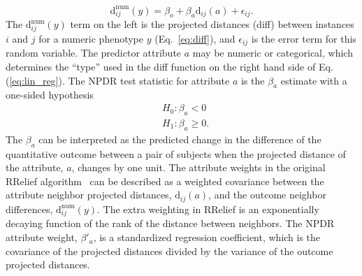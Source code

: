 \documentclass[10pt]{article}
\begin{document}

%
%
\begin{equation}\label{eq:lin_reg}
    \text{d}^{\text{num}}_{ij}(y) = \beta_{o} + \beta_{a} \text{d}_{ij}(a) + \epsilon_{ij}.
\end{equation}
The $\text{d}^{\text{num}}_{ij}(y)$ term on the left is the projected distances (diff) between instances $i$ and $j$ for a numeric phenotype $y$ (Eq.~\ref{eq:diff}), and $\epsilon_{ij}$ is the error term for this random variable.
The predictor attribute $a$ may be numeric or categorical, which determines the ``type'' used in the diff function on the right hand side of Eq.(\ref{eq:lin_reg}).
The NPDR test statistic for attribute $a$ is the $\beta_a$ estimate with a one-sided hypothesis
\begin{equation}\label{eq:linreg_null}
\begin{aligned}
    & H_0: \beta_a < 0 \\
    & H_1: \beta_a \ge 0.
\end{aligned}
\end{equation}
The $\beta_a$ can be interpreted as the predicted change in the difference of the quantitative outcome between a pair of subjects when the projected distance of the attribute, $a$, changes by one unit.
The attribute weights in the original RRelief algorithm~\cite{robnik2003theoretical} can be described as a weighted covariance between the attribute neighbor projected distances, $\text{d}_{ij}(a)$, and the outcome neighbor differences, $\text{d}^{\text{num}}_{ij}(y)$.
The extra weighting in RRelief is an exponentially decaying function of the rank of the distance between neighbors.
The NPDR attribute weight, $\beta'_a$, is a standardized regression coefficient, which is the covariance of the projected distances divided by the variance of the outcome projected distances.
\end{document}
